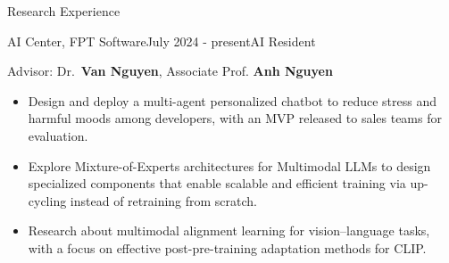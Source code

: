 \documentclass{resume} %
\begin{document}

\begin{rSection}{Research Experience}
    \begin{rSubsectionNoBullet}{AI Center, FPT Software}{July 2024 - present}{AI Resident}{}
    \item Advisor: Dr.\ \textbf{Van Nguyen}, Associate Prof. \textbf{Anh Nguyen}
    \begin{itemize}
        \item {Design and deploy a multi-agent personalized chatbot to reduce stress and harmful moods among developers, with an MVP released to sales teams for evaluation.}
        \item {Explore Mixture-of-Experts architectures for Multimodal LLMs to design specialized components that enable scalable and efficient training via up-cycling instead of retraining from scratch.}
        \item {Research about multimodal alignment learning for vision–language tasks, with a focus on effective post-pre-training adaptation methods for CLIP.}
    
    \end{itemize}
    \end{rSubsectionNoBullet}


\end{rSection}
\end{document}
